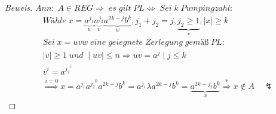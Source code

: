 \begin{proof}[Beweis]
	\begin{math}
		Ann:\;A\in REG\Rightarrow\;es\;gilt\;PL\Leftrightarrow\;Sei\;k\;Pumpingzahl:
	\end{math}
	\begin{align*}
		&Wähle\;x=\underbrace{a^{j_1}}_u\underbrace{a^{j_2}}_v\underbrace{a^{2k-j}b^k}_w,j_1+j_2=j,\underbrace{j_2\ge1}_*,\mid x\mid\ge k\\
		&Sei\;x=uvw\;eine\;geiegnete\;Zerlegung\;gemäß\;PL:\\
		&\mid v\mid\ge1\;und\;\mid uv\mid\le n \Rightarrow uv=a^j\mid j\le k\\
		&v^i=a^{{j_2}^i}\\
		&\overset{i=0}{\Longrightarrow} x=a^{j_1}a^{{j_2}^0}a^{2k-j}b^k=a^{j_1}\lambda a^{2k-j}b^k=\underbrace{a^{2k-j_2}b^k}_x\overset{*}{\Rightarrow}x\notin A\quad\lightning
	\end{align*}
\end{proof}